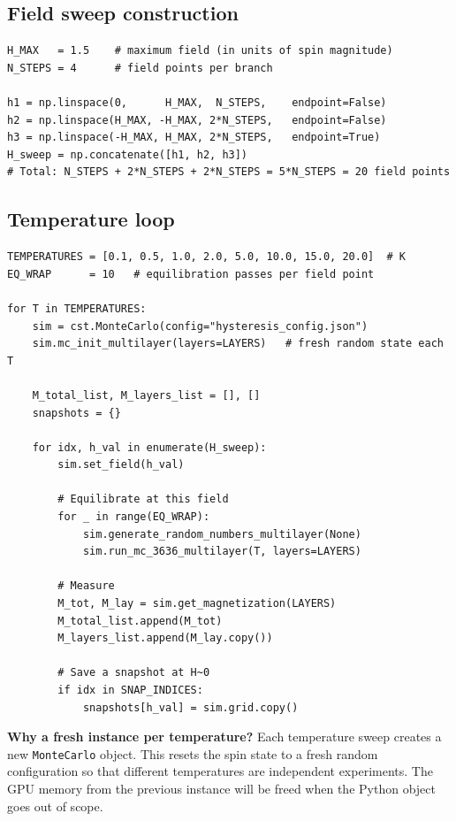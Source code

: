 \documentclass[12pt,a4paper]{article}
\newcommand{\code}[1]{\texttt{#1}}
\begin{document}
\subsection{Field sweep construction}

\begin{lstlisting}[style=python]
H_MAX   = 1.5    # maximum field (in units of spin magnitude)
N_STEPS = 4      # field points per branch

h1 = np.linspace(0,      H_MAX,  N_STEPS,    endpoint=False)
h2 = np.linspace(H_MAX, -H_MAX, 2*N_STEPS,   endpoint=False)
h3 = np.linspace(-H_MAX, H_MAX, 2*N_STEPS,   endpoint=True)
H_sweep = np.concatenate([h1, h2, h3])
# Total: N_STEPS + 2*N_STEPS + 2*N_STEPS = 5*N_STEPS = 20 field points
\end{lstlisting}

\subsection{Temperature loop}

\begin{lstlisting}[style=python]
TEMPERATURES = [0.1, 0.5, 1.0, 2.0, 5.0, 10.0, 15.0, 20.0]  # K
EQ_WRAP      = 10   # equilibration passes per field point

for T in TEMPERATURES:
    sim = cst.MonteCarlo(config="hysteresis_config.json")
    sim.mc_init_multilayer(layers=LAYERS)   # fresh random state each T

    M_total_list, M_layers_list = [], []
    snapshots = {}

    for idx, h_val in enumerate(H_sweep):
        sim.set_field(h_val)

        # Equilibrate at this field
        for _ in range(EQ_WRAP):
            sim.generate_random_numbers_multilayer(None)
            sim.run_mc_3636_multilayer(T, layers=LAYERS)

        # Measure
        M_tot, M_lay = sim.get_magnetization(LAYERS)
        M_total_list.append(M_tot)
        M_layers_list.append(M_lay.copy())

        # Save a snapshot at H~0
        if idx in SNAP_INDICES:
            snapshots[h_val] = sim.grid.copy()
\end{lstlisting}

\begin{notebox}
\textbf{Why a fresh instance per temperature?}
Each temperature sweep creates a new \code{MonteCarlo} object. This resets the
spin state to a fresh random configuration so that different temperatures are
independent experiments. The GPU memory from the previous instance will be
freed when the Python object goes out of scope.
\end{notebox}
\end{document}
